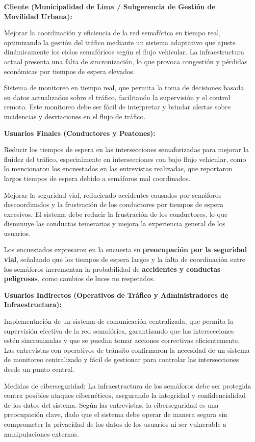 \documentclass[12pt,a4paper,oneside]{report}
\begin{document}
\textbf{Cliente (Municipalidad de Lima / Subgerencia de Gestión de Movilidad Urbana):}

Mejorar la coordinación y eficiencia de la red semafórica en tiempo real, optimizando la gestión del tráfico mediante un sistema adaptativo que ajuste dinámicamente los ciclos semafóricos según el flujo vehicular. La infraestructura actual presenta una falta de sincronización, lo que provoca congestión y pérdidas económicas por tiempos de espera elevados.

Sistema de monitoreo en tiempo real, que permita la toma de decisiones basada en datos actualizados sobre el tráfico, facilitando la supervisión y el control remoto. Este monitoreo debe ser fácil de interpretar y brindar alertas sobre incidencias y desviaciones en el flujo de tráfico.

\textbf{Usuarios Finales (Conductores y Peatones):}

Reducir los tiempos de espera en las intersecciones semaforizadas para mejorar la fluidez del tráfico, especialmente en intersecciones con bajo flujo vehicular, como lo mencionaron los encuestados en las entrevistas realizadas, que reportaron largos tiempos de espera debido a semáforos mal coordinados.

Mejorar la seguridad vial, reduciendo accidentes causados por semáforos descoordinados y la frustración de los conductores por tiempos de espera excesivos. El sistema debe reducir la frustración de los conductores, lo que disminuye las conductas temerarias y mejora la experiencia general de los usuarios.

Los encuestados expresaron en la encuesta su \textbf{preocupación por la seguridad vial}, señalando que los tiempos de espera largos y la falta de coordinación entre los semáforos incrementan la probabilidad de \textbf{accidentes y conductas peligrosas}, como cambios de luces no respetados.

\textbf{Usuarios Indirectos (Operativos de Tráfico y Administradores de Infraestructura):}

Implementación de un sistema de comunicación centralizada, que permita la supervisión efectiva de la red semafórica, garantizando que las intersecciones estén sincronizadas y que se puedan tomar acciones correctivas eficientemente. Las entrevistas con operativos de tránsito confirmaron la necesidad de un sistema de monitoreo centralizado y fácil de gestionar para controlar las intersecciones desde un punto central.

Medidas de ciberseguridad: La infraestructura de los semáforos debe ser protegida contra posibles ataques cibernéticos, asegurando la integridad y confidencialidad de los datos del sistema. Según las entrevistas, la ciberseguridad es una preocupación clave, dado que el sistema debe operar de manera segura sin comprometer la privacidad de los datos de los usuarios ni ser vulnerable a manipulaciones externas.
\end{document}
